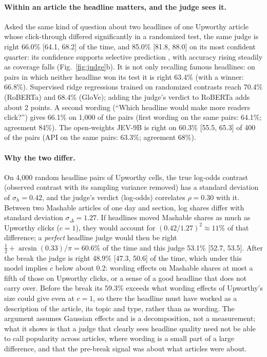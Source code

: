 \documentclass[10pt,a4paper,twocolumn]{article}
\begin{document}
\paragraph{Within an article the headline matters, and the judge sees it.} Asked the same kind of question about
two headlines of one Upworthy article whose click-through differed significantly in a randomized test, the same
judge is right 66.0\% [64.1, 68.2] of the time, and 85.0\% [81.8, 88.0] on its most confident quarter: its
confidence supports selective prediction \citep{geifman2017}, with accuracy rising steadily as coverage falls
(Fig.~\ref{fig:judge}b). It is not
only recalling famous headlines: on pairs in which neither headline won its test it is right 63.4\% (with a winner:
66.8\%). Supervised ridge regressions trained on randomized contrasts reach 70.4\% (RoBERTa) and 68.4\% (GloVe);
adding the judge's verdict to RoBERTa adds about 2 points. A second wording (``Which headline would make more readers
click?'') gives 66.1\% on 1{,}000 of the pairs (first wording on the same pairs: 64.1\%; agreement 84\%). The open-weights JEV-9B is right on 60.3\% [55.5, 65.3] of 400 of the pairs (API on the same
pairs: 63.3\%; agreement 68\%).

\paragraph{Why the two differ.} On 4{,}000 random headline pairs of Upworthy cells, the true log-odds contrast
(observed contrast with its sampling variance removed) has a standard deviation of $\sigma_h=0.42$, and the judge's
verdict (log-odds) correlates $\rho=0.30$ with it. Between two Mashable articles
of one day and section, log shares differ with standard deviation $\sigma_\Delta=1.27$. If headlines moved Mashable
shares as much as Upworthy clicks ($c=1$), they would account for $(0.42/1.27)^2\approx11\%$ of that difference;
a \emph{perfect} headline judge would then be right $\tfrac12+\arcsin(0.33)/\pi=60.6\%$ of the time and this judge
53.1\% [52.7, 53.5]. After the break the judge is right 48.9\% [47.3, 50.6] of the time, which under this model
implies $c$ below about 0.2: wording effects on Mashable shares at most a fifth of those on Upworthy clicks, or a
sense of a good headline that does not carry over. Before the break its 59.3\% exceeds what wording effects of
Upworthy's size could give even at $c=1$, so there the headline must have worked as a description of the
article, its topic and type, rather than as wording. The argument assumes Gaussian effects and is a decomposition, not
a measurement; what it shows is that a judge that clearly sees headline quality need not be able to call popularity
across articles, where wording is a small part of a large difference, and that the pre-break signal was about what
articles were about.
\end{document}
